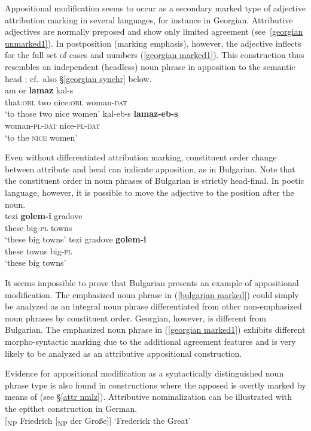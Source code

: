 Appositional modification seems to occur as a secondary marked type of adjective attribution marking in several languages, for instance in Georgian. Attributive adjectives are normally preposed and show only limited agreement (see~\ref{georgian unmarked1}). In postposition (marking emphasis), however, the adjective inflects for the full set of cases and numbers (\ref{georgian marked1}). This construction thus resembles an independent (headless) noun phrase in apposition to the semantic head \citep[652, 677]{testelec1998}; cf.~also \S\ref{georgian synchr} below.
\ea
{}\\
\ea
\label{georgian unmarked1}
\gll	am or \textbf{lamaz} kal-s\\
	that:\textsc{obl} two nice:\textsc{obl} woman-\textsc{dat}\\
\glt	‘to those two nice women’
\ex
\label{georgian marked1}
\gll	kal-eb-s \textbf{lamaz-eb-s}\\
	woman-\textsc{pl}-\textsc{dat} nice-\textsc{pl}-\textsc{dat}\\
\glt	‘to the \textsc{nice} women’
\z
\z

Even without differentiated attribution marking, constituent order change between attribute and head can indicate apposition, as in Bulgarian. Note that the constituent order in noun phrases of Bulgarian is strictly head-final. In poetic language, however, it is possible to move the adjective to the position after the noun.
\ea
{}\\
\ea
\gll	tezi \textbf{golem-i} gradove\\
	these big-\textsc{pl} towns\\
\glt	‘these big towns’
\ex
\label{bulgarian marked}
\gll	tezi gradove \textbf{golem-i}\\
	these towns big-\textsc{pl}\\
\glt	‘these big towns’
\z
\z

It seems impossible to prove that Bulgarian presents an example of appositional modification. The emphasized noun phrase in (\ref{bulgarian marked}) could simply be analyzed as an integral noun phrase differentiated from other non-emphasized noun phrases by constituent order. Georgian, however, is different from Bulgarian. The emphasized noun phrase in (\ref{georgian marked1}) exhibits different morpho-syntactic marking due to the additional agreement features and is very likely to be analyzed as an attributive appositional construction.

Evidence for appositional modification as a syntactically distinguished noun phrase type is also found in constructions where the apposed  is overtly marked by means of  (see \S\ref{attr nmlz}). Attributive nominalization can be illustrated with the epithet construction in German.
\ea 
{}\\
{\upshape [}\textsubscript{\rm NP} Friedrich {\upshape [}\textsubscript{\rm NP} der Große{\upshape ]]} {\rm ‘Frederick the Great’}
\z
{}
